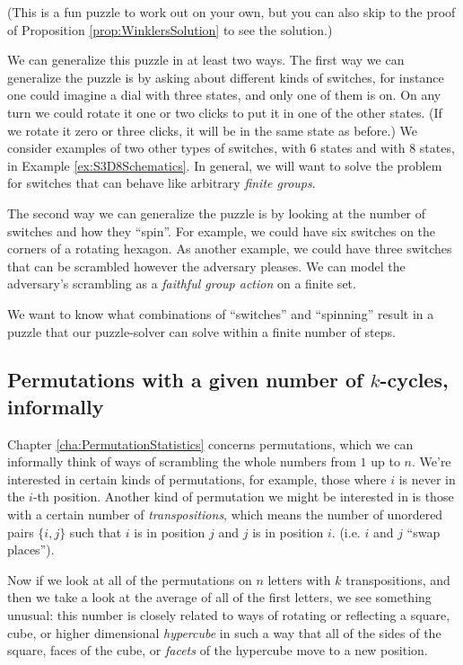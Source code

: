 (This is a fun puzzle to work out on your own, but you can also skip to
the proof of Proposition \ref{prop:WinklersSolution} to see the solution.)

We can generalize this puzzle in at least two ways.
The first way we can generalize the puzzle is by asking about different kinds of
switches, for instance one could imagine a dial with three states,
and only one of them is on. On any turn we could rotate it one or two
clicks to put it in one of the other states.
(If we rotate it zero or three clicks, it will be in the same state as before.)
We consider examples of two other types of switches,
with $6$ states and with $8$ states, in Example \ref{ex:S3D8Schematics}.
In general, we will want to solve the problem for switches that can behave like
arbitrary \textit{finite groups}.

The second way we can generalize the puzzle is by looking at the number of
switches and how they ``spin''. For example, we could have six switches on
the corners of a rotating hexagon. As another example, we could have three
switches that can be scrambled however the adversary pleases.
We can model the adversary's scrambling as a \textit{faithful group action}
on a finite set.

We want to know what combinations of ``switches'' and ``spinning''
result in a puzzle that our puzzle-solver can solve within a finite number of
steps.

\subsection{Permutations with a given number of \texorpdfstring{$k$}{k}-cycles, informally}
Chapter \ref{cha:PermutationStatistics} concerns permutations,
which we can informally think of ways of
scrambling the whole numbers from $1$ up to $n$. We're interested in certain
kinds of permutations, for example, those where $i$ is never in the $i$-th
position. Another kind of permutation we might be interested in is those with
a certain number of \textit{transpositions}, which means the number of unordered
pairs $\{i, j\}$ such that $i$ is in position $j$ and $j$ is in position $i$.
(i.e. $i$ and $j$ ``swap places'').

Now if we look at all of the permutations on $n$ letters with $k$ transpositions,
and then we take a look at the average of all of the first letters, we see
something unusual: this number is closely related to ways of rotating or
reflecting a square, cube, or higher dimensional \textit{hypercube}
in such a way that all of the sides of the square, faces of the cube, or
\textit{facets} of the hypercube move to a new position.

